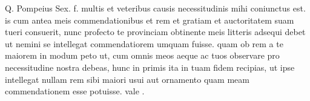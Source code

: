 


Q. Pompeius Sex. f. multis et veteribus causis necessitudinis mihi coniunctus est. is cum antea meis commendationibus et rem et gratiam et auctoritatem suam tueri consuerit, nunc profecto te provinciam obtinente meis litteris adsequi debet ut nemini se intellegat commendatiorem umquam fuisse. quam ob rem a te maiorem in modum peto ut, cum omnis meos aeque ac tuos observare pro necessitudine nostra debeas, hunc in primis ita in tuam fidem recipias, ut ipse intellegat nullam rem sibi maiori usui aut ornamento quam meam commendationem esse potuisse. vale .
